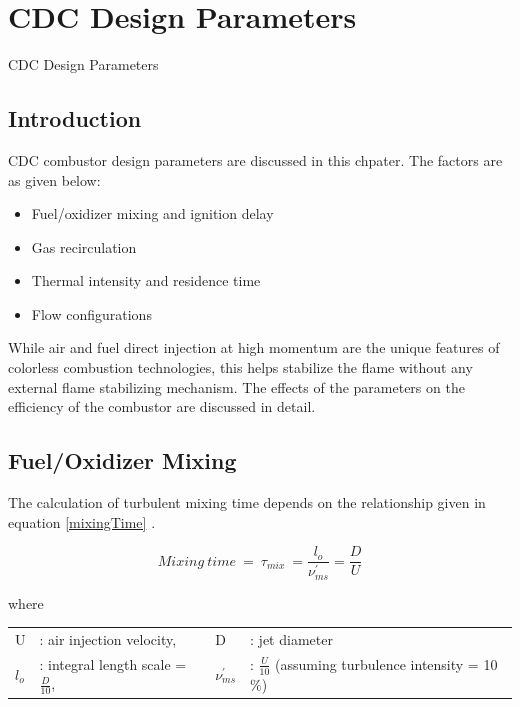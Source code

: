 \chapter[CDC Design Parameters]{CDC Design Parameters}{CDC Design Parameters}\label{CH3:CDC}

\section{Introduction}
CDC combustor design parameters are discussed in this chpater. The factors are as given below:
\begin{itemize}
    \item Fuel/oxidizer mixing and ignition delay
    \item Gas recirculation
    \item Thermal intensity and residence time
    \item Flow configurations
\end{itemize}

While air and fuel direct injection at high momentum are the unique features of colorless combustion technologies, this helps stabilize the flame without any external flame stabilizing mechanism. The effects of the parameters on the efficiency of the combustor are discussed in detail.

\section{Fuel/Oxidizer Mixing}
The calculation of turbulent mixing time depends on the relationship given in equation \ref{mixingTime} \cite{StephenCombustion2011, FORNEY1998728}. 

\begin{equation}\label{mixingTime}
    Mixing\ time \ = \ \tau_{mix} \ = \frac{l_o}{\nu_{ms}^{'}}  =  \frac{D}{U}
\end{equation}

where
\begin{table}[h!]
    \centering
    \begin{tabular}{l l l l}
        U &  : air injection velocity, & D & : jet diameter \\
        $l_o$ &  : integral length scale  = $\frac{D}{10}$, & $\nu_{ms}^{'}$ &  : $\frac{U}{10}$ (assuming turbulence intensity = 10$\%$)\\
    \end{tabular}
    \label{turbulentMixing}
\end{table}

